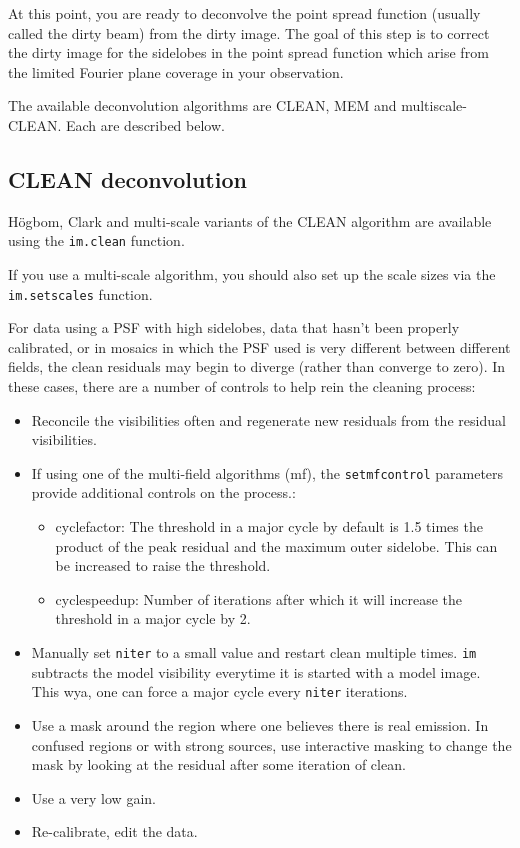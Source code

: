 At this point, you are ready to deconvolve the point spread function
(usually called the dirty beam) from the dirty image.  The goal of
this step is to correct the dirty image for the sidelobes in the point
spread function which arise from the limited Fourier plane coverage in
your observation.

The available deconvolution algorithms are CLEAN, MEM and
multiscale-CLEAN.  Each are described below.  

\subsection{CLEAN deconvolution} 
\label{section:imtool.decon.clean}

H\"ogbom, Clark and multi-scale variants of the CLEAN algorithm are
available using the {\tt im.clean} function.

If you use a multi-scale algorithm, you should also set up the scale
sizes via the {\tt im.setscales} function.

\vspace{3mm}

For data using a PSF with high sidelobes, data that hasn't been
properly calibrated, or in mosaics in which the PSF used is very
different between different fields, the clean residuals may begin to
diverge (rather than converge to zero). In these cases, there are a
number of controls to help rein the cleaning process:

\begin{itemize}
  \item Reconcile the visibilities often and regenerate new residuals
        from the residual visibilities. 
  \item If using one of the multi-field algorithms (mf), the
        {\tt setmfcontrol} parameters provide additional controls on the
        process.:
     \begin{itemize}
     \item cyclefactor: The threshold in a major cycle by default is
           1.5 times the product of the peak residual and the maximum outer
           sidelobe. This can be increased to raise the threshold. 
     \item cyclespeedup: Number of iterations after which it will
           increase the threshold in a major cycle by 2. 
      \end{itemize}
 \item Manually set {\tt niter} to a small value and restart clean
       multiple times. {\tt im} subtracts the model visibility everytime it
       is started with a model image. This wya, one can force a major
       cycle every {\tt niter} iterations. 
 \item Use a mask around the region where one believes there is real
       emission. In confused regions or with strong sources, use
       interactive masking to change the 
       mask by looking at the residual after some iteration of clean. 
 \item Use a very low gain.
 \item Re-calibrate, edit the data.
\end{itemize}


